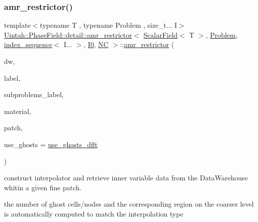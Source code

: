 \subsubsection{\texorpdfstring{amr\+\_\+restrictor()}{amr\_restrictor()}\hspace{0.1cm}{\footnotesize\ttfamily [3/4]}}
{\footnotesize\ttfamily template$<$typename T , typename Problem , size\+\_\+t... I$>$ \\
\hyperlink{classUintah_1_1PhaseField_1_1detail_1_1amr__restrictor}{Uintah\+::\+Phase\+Field\+::detail\+::amr\+\_\+restrictor}$<$ \hyperlink{structUintah_1_1PhaseField_1_1ScalarField}{Scalar\+Field}$<$ T $>$, \hyperlink{classUintah_1_1PhaseField_1_1Problem}{Problem}, \hyperlink{namespaceUintah_1_1PhaseField_a237de804d99512e50613aff7c94a9461}{index\+\_\+sequence}$<$ I... $>$, \hyperlink{namespaceUintah_1_1PhaseField_a547ce3002aa97fbd3ef3192a6eec8406abdd8ebcbdfd71d1125937e3012dc45fb}{I0}, \hyperlink{namespaceUintah_1_1PhaseField_a33d355affda78a83f45755ba8388cedda77924170fe82bfd58b74ca3e44139718}{NC} $>$\+::\hyperlink{classUintah_1_1PhaseField_1_1detail_1_1amr__restrictor}{amr\+\_\+restrictor} (\begin{DoxyParamCaption}\item[{Data\+Warehouse $\ast$}]{dw,  }\item[{const Var\+Label $\ast$}]{label,  }\item[{const Var\+Label $\ast$}]{subproblems\+\_\+label,  }\item[{int}]{material,  }\item[{const Patch $\ast$}]{patch,  }\item[{bool}]{use\+\_\+ghosts = {\ttfamily \hyperlink{classUintah_1_1PhaseField_1_1detail_1_1amr__restrictor_3_01ScalarField_3_01T_01_4_00_01Problem_05760ee5d1d3adcc969b3f56f71e72acb_a1579c120a731bc2c5e5d53a3e3db51dc}{use\+\_\+ghosts\+\_\+dflt}} }\end{DoxyParamCaption})\hspace{0.3cm}{\ttfamily [inline]}}



construct interpolator and retrieve inner variable data from the Data\+Warehouse whitin a given fine patch. 

the number of ghost cells/nodes and the corresponding region on the coarser level is automatically computed to match the interpolation type


